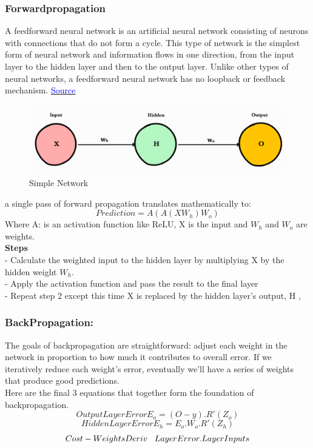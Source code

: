 \subsubsection{Forwardpropagation}

A feedforward neural network is an artificial neural network consisting of neurons with connections that do not form a cycle. This type of network is the simplest form of neural network and information flows in one direction, from the input layer to the hidden layer and then to the output layer. Unlike other types of neural networks, a feedforward neural network has no loopback or feedback mechanism. \cite{coates2011analysis} \cite{ansari2020building} \href{https://ml-cheatsheet.readthedocs.io/en/latest/forwardpropagation.html}{\textcolor{blue}{Source}}
\begin{figure}[H]
    \centering
    \includegraphics[width=0.7\linewidth]{tex/img/Forwardpropagation.PNG}
    \caption{Simple Network}
    \label{fig:enter-label}
\end{figure}
a single pass of forward propagation translates mathematically to:
\[Prediction=A(A(XW_{h})W_{o})\]
Where A:    is an activation function like ReLU, X is the input and $W_{h}$ and $W_{o}$ are weights.\\

\textbf{Steps}\\
- Calculate the weighted input to the hidden layer by multiplying X by the hidden weight $W_{h}$.\\
- Apply the activation function and pass the result to the final layer \\
- Repeat step 2 except this time X is replaced by the hidden layer’s output, H \cite{ansari2020building}, \cite{nielsen2015neural}

\subsubsection{BackPropagation: }
The goals of backpropagation are straightforward: adjust each weight in the network in proportion to how much it contributes to overall error. If we iteratively reduce each weight’s error, eventually we’ll have a series of weights that produce good predictions.\\
Here are the final 3 equations that together form the foundation of backpropagation. \cite{hecht1992theory} \cite{nielsen2015neural}
 \[
 Output Layer Error    E_{o} = (O-y).R'(Z_{o})
 \]
 \[ 
 Hidden Layer Error    E_{h} = E_{o}.W_{o}.R'(Z_{h})
 \]
 \[ 
 Cost-Weights Deriv \hspace{3mm}   LayerError.LayerInputs
 \]


